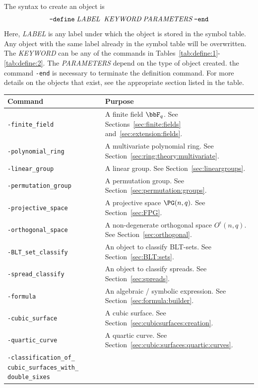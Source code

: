 The syntax to create an object is
$$
\verb'-define' \; \mbox{\em LABEL} \;  \; \mbox{\em KEYWORD} \; \mbox{\em PARAMETERS} \; \verb'-end'
$$
Here, {\em LABEL} is any label under which the object is stored in the symbol table. 
Any object with the same label already in the symbol table will be overwritten.
The {\em KEYWORD} can be any of the commands in Tables~\ref{tab:define:1}-\ref{tab:define:2}.
The {\em PARAMETERS} depend on the type of object created. 
the command \verb'-end' is necessary to terminate the definition command.
For more details on the objects that exist, see the appropriate section listed in the table.
\begin{table}
	\begin{center}
	\begin{tabular}{|p{7cm}|p{7cm}|}
		\hline
		Command  & Purpose \\
		\hline
		\hline
		\verb'-finite_field' &      A finite field $\bbF_q$. See Sections~\ref{sec:finite:fields} and~\ref{sec:extension:fields}.\\
		\hline
		\verb'-polynomial_ring' &      A multivariate polynomial ring. See Section~\ref{sec:ring:theory:multivariate}.\\
		\hline
		\verb'-linear_group' &      A linear group. See Section~\ref{sec:lineargroups}.\\
		\hline
		\verb'-permutation_group' &      A permutation group. See Section~\ref{sec:permutation:groups}.\\
		\hline
		\verb'-projective_space' &  A projective space $\PG(n,q).$  See Section~\ref{sec:FPG}.\\
		\hline
		\verb'-orthogonal_space' &     A non-degenerate orthogonal space $O^\epsilon(n,q)$. See Section~\ref{sec:orthogonal}.\\
		\hline
		\verb'-BLT_set_classify' &     An object to classify BLT-sets. See Section~\ref{sec:BLT:sets}.\\
		\hline
		\verb'-spread_classify' &     An object to classify spreads. See Section~\ref{sec:spreads}.\\
		\hline
		\verb'-formula' &      An algebraic / symbolic expression. See Section~\ref{sec:formula:builder}.\\
		\hline
		\verb'-cubic_surface' &      A cubic surface. See Section~\ref{sec:cubicsurfaces:creation}.\\
		\hline
		\verb'-quartic_curve' &      A quartic curve. See Section~\ref{sec:cubic:surfaces:quartic:curves}.\\
		\hline
		\verb'-classification_of_' \verb'cubic_surfaces_with_' \verb'double_sixes' &      

\end{tabular}
\end{center}
\end{table}

